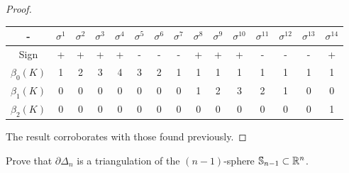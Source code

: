 \begin{proof}
\begin{enumerate}
    \begin{center}
        \begin{tabular}{ c|c|c|c|c|c|c|c|c|c|c|c|c|c|c}
         - & $\sigma^1$ & $\sigma^2$ & $\sigma^3$ & $\sigma^4$ & $\sigma^5$ &
         $\sigma^6$ & $\sigma^7$ &$\sigma^8$ &$\sigma^9$ &$\sigma^{10}$
         &$\sigma^{11}$ &$\sigma^{12}$ &$\sigma^{13}$ &$\sigma^{14}$ \\ 
         \hline
         Sign & + & + & + & + & - & - & - & + & + & + & - & - & - & + \\  
         $\beta_0(K)$ & 1 & 2 & 3 & 4 & 3 & 2 & 1 & 1 & 1 & 1 & 1 & 1 & 1 & 1\\ 
         $\beta_1(K)$ & 0 & 0 & 0 & 0 & 0 & 0 & 0 & 1 & 2 & 3 & 2 & 1 & 0 & 0 \\     
         $\beta_2(K)$ & 0 & 0 & 0 & 0 & 0 & 0 & 0 & 0 & 0 & 0 & 0 & 0 & 0 & 1\\     

        \end{tabular}
    \end{center}

\end{enumerate}

The result corroborates with those found previously. 

\end{proof}

\noindent\linia

\begin{exercise}
    Prove that $\partial \Delta_n$ is a triangulation of the $(n -1)$-sphere
    $\mathbb{S}_{n-1} \subset \mathbb{R}^n$. 
\end{exercise}

